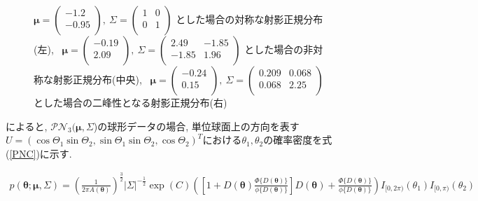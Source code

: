 \documentclass[a4j,11pt]{jarticle}
\begin{document}
\begin{figure}[H]
\begin{tabular}{c}
  \end{tabular}
\caption[Text excluding the matrix]{
$\bm \mu = \begin{pmatrix} -1.2 \\ -0.95 \\ \end{pmatrix}, \ \Sigma = \begin{pmatrix}  1 & 0 \\ 0 & 1 \\ \end{pmatrix}$
とした場合の対称な射影正規分布(左), 
\ $\bm \mu = \begin{pmatrix} -0.19 \\ 2.09 \\ \end{pmatrix}, \ \Sigma = \begin{pmatrix} 2.49 & -1.85 \\ -1.85 & 1.96 \\ \end{pmatrix}$ とした場合の非対称な射影正規分布(中央), 
\ $\bm \mu = \begin{pmatrix} -0.24 \\ 0.15 \\ \end{pmatrix}, \ \Sigma = \begin{pmatrix} 0.209 & 0.068\\ 0.068 & 2.25 \\ \end{pmatrix}$ とした場合の二峰性となる射影正規分布(右)}
\label{sample_pn}
\end{figure}


\citet{SGPN}によると, $\mathcal{PN}_3(\bm \mu,\Sigma$)の球形データの場合, 単位球面上の方向を表す$U = (\cos\Theta_1 \sin \Theta_2, \sin\Theta_1 \sin \Theta_2, \cos \Theta_2)^T$における$\theta_1, \theta_2$の確率密度を式(\ref{PNC})に示す.

\vspace{-1zh}
\begin{eqnarray}
\label{PNS}
p(\bm \theta; \bm \mu, \Sigma) = \left(\frac{1}{2\pi A(\bm \theta)}\right)^{\frac{3}{2}} |\Sigma|^{-\frac{1}{2}}
\exp(C)\left( \left[1 + D(\bm \theta) \frac{\Phi \{D(\bm \theta)\}}{\phi \{D(\bm \theta)\}} \right] D(\bm \theta) + \frac{\Phi \{D(\bm \theta)\}}{\phi \{D(\bm \theta)\}} \right) I_{[0,2\pi)}(\theta_1) I_{[0,\pi)}(\theta_2)
\end{eqnarray}
\end{document}
